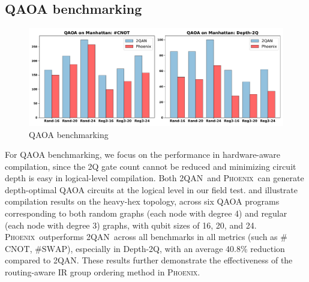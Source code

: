 \documentclass[conference,9pt]{IEEEtran}
\newcommand{\phoenix}{\textsc{Phoenix}}
\newcommand{\twoqan}{\textsc{2QAN}}
\newcommand{\SWAP}{\mathrm{SWAP}}
\newcommand{\CNOT}{\mathrm{CNOT}}
\begin{document}







\subsection{QAOA benchmarking}

    \begin{figure}[tbp]
        \centering
        \includegraphics[width=\columnwidth]{figures/qaoa.pdf}
        \caption{QAOA benchmarking}
        \label{fig:qaoa}
    \end{figure}



    \begin{table}[btp]
        \centering
        \caption{QAOA benchmarking versus 2QAN.}
        \setlength{\tabcolsep}{3.8pt}
        \scalebox{0.76}{
            
        }
        \label{tab:qaoa}
    \end{table}

    For QAOA benchmarking, we focus on the performance in hardware-aware compilation, since the 2Q gate count cannot be reduced and minimizing circuit depth is easy in logical-level compilation. Both \twoqan\ and \phoenix\ can generate depth-optimal QAOA circuits at the logical level in our field test.  and  illustrate compilation results on the heavy-hex topology, across six QAOA programs corresponding to both random graphs (each node with degree 4) and regular (each node with degree 3) graphs, with qubit sizes of 16, 20, and 24. \phoenix\ outperforms \twoqan\ across all benchmarks in all metrics (such as \#$ \CNOT $, \#$ \SWAP $), especially in Depth-2Q, with an average 40.8\% reduction compared to \twoqan. These results further demonstrate the effectiveness of the routing-aware IR group ordering method in \phoenix.
\end{document}
